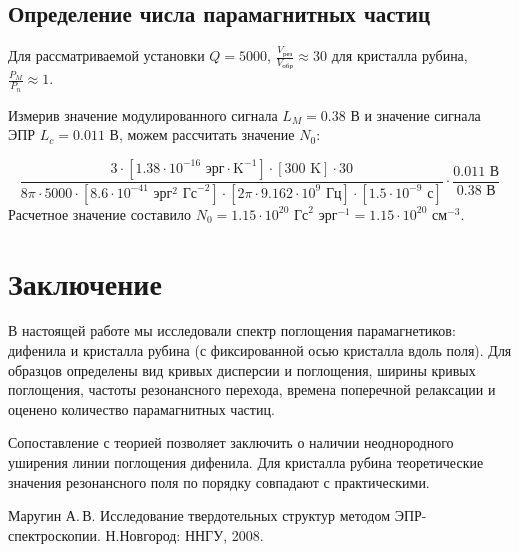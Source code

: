 \documentclass[a4paper,14pt]{extarticle}
\begin{document}
\subsection{Определение числа парамагнитных частиц}
Для рассматриваемой установки  $Q=5000$, $\frac{V_\text{рез}}{V_\text{обр}} \approx 30$ для кристалла рубина, $ \frac{P_M}{P_n}\approx1$. 

Измерив значение модулированного сигнала $L_M=0.38$ В и значение сигнала ЭПР $L_c=0.011$ В, можем рассчитать значение $N_0$:

\begin{equation}
  \frac{3\cdot [1.38\cdot10^{-16} \text{ эрг}\cdot\text{K}^{-1}]\cdot [300 \text{ K}]\cdot 30}{8\pi \cdot 5000 \cdot [8.6\cdot 10^{-41} \text{ эрг}^2\text{ Гс}^{-2}]\cdot [2\pi\cdot 9.162\cdot 10^9 \text{ Гц} ]\cdot [1.5 \cdot 10^{-9} \text{ с}]}\cdot \frac{0.011 \text{ В}}{0.38 \text{ В}}
\end{equation}
Расчетное значение составило $N_0=1.15\cdot 10^{20} \text{ Гс}^2 \text{ эрг}^{-1}=1.15\cdot 10^{20} \text{ см}^{-3}$.

\section*{Заключение}
В настоящей работе мы исследовали спектр поглощения парамагнетиков: дифенила и кристалла рубина (с фиксированной осью кристалла вдоль поля). Для образцов определены вид кривых дисперсии и поглощения, ширины кривых поглощения, частоты резонансного перехода, времена поперечной релаксации и оценено количество парамагнитных частиц.

Сопоставление с теорией позволяет заключить о наличии неоднородного уширения линии поглощения дифенила. Для кристалла рубина теоретические значения резонансного поля по порядку совпадают с практическими.

\begin{thebibliography}{}

   Маругин\,\,А.\,В. Исследование твердотельных структур методом ЭПР-спектроскопии. Н.Новгород: ННГУ, 2008.
\end{thebibliography}
\end{document}
